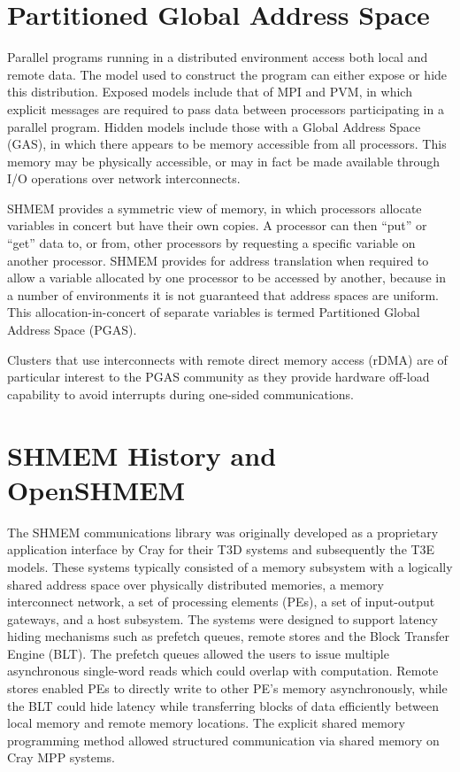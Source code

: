 \documentclass[english]{article}
\begin{document}
\section{Partitioned Global Address Space}

Parallel programs running in a distributed environment access both
local and remote data. The model used to construct the program can
either expose or hide this distribution. Exposed models include that
of MPI and PVM, in which explicit messages are required to pass data
between processors participating in a parallel program. Hidden models
include those with a Global Address Space (GAS), in which there
appears to be memory accessible from all processors. This memory may
be physically accessible, or may in fact be made available through I/O
operations over network interconnects.

SHMEM provides a symmetric view of memory, in which processors
allocate variables in concert but have their own copies. A processor
can then ``put'' or ``get'' data to, or from, other processors by
requesting a specific variable on another processor. SHMEM provides
for address translation when required to allow a variable allocated by
one processor to be accessed by another, because in a number of
environments it is not guaranteed that address spaces are
uniform. This allocation-in-concert of separate variables is termed
Partitioned Global Address Space (PGAS).

Clusters that use interconnects with remote direct memory access
(rDMA) are of particular interest to the PGAS community as they
provide hardware off-load capability to avoid interrupts during
one-sided communications.

\section{SHMEM History and OpenSHMEM}

The SHMEM communications library was originally developed as a
proprietary application interface by Cray for their T3D systems and
subsequently the T3E models. These systems typically consisted of a
memory subsystem with a logically shared address space over physically
distributed memories, a memory interconnect network, a set of
processing elements (PEs), a set of input-output gateways, and a host
subsystem. The systems were designed to support latency hiding
mechanisms such as prefetch queues, remote stores and the Block
Transfer Engine (BLT). The prefetch queues allowed the users to issue
multiple asynchronous single-word reads which could overlap with
computation. Remote stores enabled PEs to directly write to other PE's
memory asynchronously, while the BLT could hide latency while
transferring blocks of data efficiently between local memory and
remote memory locations. The explicit shared memory programming method
allowed structured communication via shared memory on Cray MPP
systems.
\end{document}
